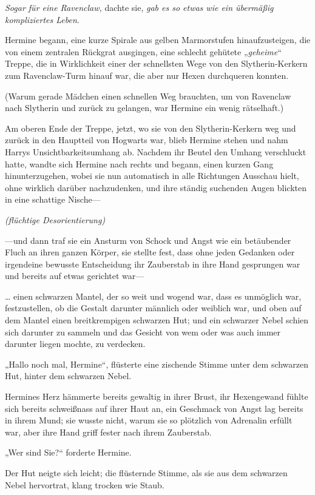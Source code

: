 {\emph{Sogar für eine Ravenclaw,} dachte sie, \emph{gab es so etwas wie ein übermäßig kompliziertes Leben}.

Hermine begann, eine kurze Spirale aus gelben Marmorstufen hinaufzusteigen, die von einem zentralen Rückgrat ausgingen, eine schlecht gehütete „\emph{geheime}“ Treppe, die in Wirklichkeit einer der schnellsten Wege von den Slytherin-Kerkern zum Ravenclaw-Turm hinauf war, die aber nur Hexen durchqueren konnten.

(Warum gerade Mädchen einen schnellen Weg brauchten, um von Ravenclaw nach Slytherin und zurück zu gelangen, war Hermine ein wenig rätselhaft.)

Am oberen Ende der Treppe, jetzt, wo sie von den Slytherin-Kerkern weg und zurück in den Hauptteil von Hogwarts war, blieb Hermine stehen und nahm Harrys Unsichtbarkeitsumhang ab. Nachdem ihr Beutel den Umhang verschluckt hatte, wandte sich Hermine nach rechts und begann, einen kurzen Gang hinunterzugehen, wobei sie nun automatisch in alle Richtungen Ausschau hielt, ohne wirklich darüber nachzudenken, und ihre ständig suchenden Augen blickten in eine schattige Nische—

\emph{(flüchtige Desorientierung)}

—und dann traf sie ein Ansturm von Schock und Angst wie ein betäubender Fluch an ihren ganzen Körper, sie stellte fest, dass ohne jeden Gedanken oder irgendeine bewusste Entscheidung ihr Zauberstab in ihre Hand gesprungen war und bereits auf etwas gerichtet war—

… einen schwarzen Mantel, der so weit und wogend war, dass es unmöglich war, festzustellen, ob die Gestalt darunter männlich oder weiblich war, und oben auf dem Mantel einen breitkrempigen schwarzen Hut; und ein schwarzer Nebel schien sich darunter zu sammeln und das Gesicht von wem oder was auch immer darunter liegen mochte, zu verdecken.

„Hallo noch mal, Hermine“, flüsterte eine zischende Stimme unter dem schwarzen Hut, hinter dem schwarzen Nebel.

Hermines Herz hämmerte bereits gewaltig in ihrer Brust, ihr Hexengewand fühlte sich bereits schweißnass auf ihrer Haut an, ein Geschmack von Angst lag bereits in ihrem Mund; sie wusste nicht, warum sie so plötzlich von Adrenalin erfüllt war, aber ihre Hand griff fester nach ihrem Zauberstab.

„Wer sind Sie?“ forderte Hermine.

Der Hut neigte sich leicht; die flüsternde Stimme, als sie aus dem schwarzen Nebel hervortrat, klang trocken wie Staub.

}
